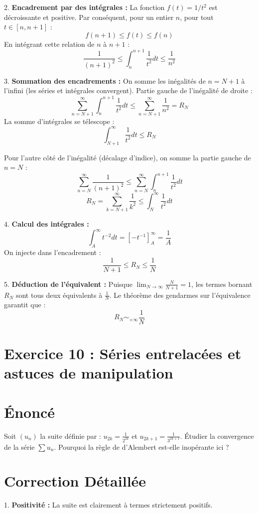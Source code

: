 \documentclass[12pt, a4paper]{article}
\begin{document}
2. \textbf{Encadrement par des intégrales :}
   La fonction $f(t) = 1/t^2$ est décroissante et positive.
   Par conséquent, pour un entier $n$, pour tout $t \in [n, n+1]$ :
   $$f(n+1) \le f(t) \le f(n)$$
   En intégrant cette relation de $n$ à $n+1$ :
   $$\frac{1}{(n+1)^2} \le \int_n^{n+1} \frac{1}{t^2} dt \le \frac{1}{n^2}$$

3. \textbf{Sommation des encadrements :}
   On somme les inégalités de $n=N+1$ à l'infini (les séries et intégrales convergent).
   Partie gauche de l'inégalité de droite :
   $$\sum_{n=N+1}^\infty \int_n^{n+1} \frac{1}{t^2} dt \le \sum_{n=N+1}^\infty \frac{1}{n^2} = R_N$$
   La somme d'intégrales se télescope :
   $$\int_{N+1}^\infty \frac{1}{t^2} dt \le R_N$$

   Pour l'autre côté de l'inégalité (décalage d'indice), on somme la partie gauche de $n=N$ :
   $$\sum_{n=N}^\infty \frac{1}{(n+1)^2} \le \sum_{n=N}^\infty \int_n^{n+1} \frac{1}{t^2} dt$$
   $$R_N = \sum_{k=N+1}^\infty \frac{1}{k^2} \le \int_N^\infty \frac{1}{t^2} dt$$

4. \textbf{Calcul des intégrales :}
   $$\int_A^\infty t^{-2} dt = \left[ -t^{-1} \right]_A^\infty = \frac{1}{A}$$
   On injecte dans l'encadrement :
   $$\frac{1}{N+1} \le R_N \le \frac{1}{N}$$

5. \textbf{Déduction de l'équivalent :}
   Puisque $\lim_{N \to \infty} \frac{N}{N+1} = 1$, les termes bornant $R_N$ sont tous deux équivalents à $\frac{1}{N}$.
   Le théorème des gendarmes sur l'équivalence garantit que :
   $$R_N \sim_{+\infty} \frac{1}{N}$$


\section*{Exercice 10 : Séries entrelacées et astuces de manipulation}

\section{Énoncé}
Soit $(u_n)$ la suite définie par :
$u_{2k} = \frac{1}{2^{2k}}$ et $u_{2k+1} = \frac{1}{3^{2k+1}}$.
Étudier la convergence de la série $\sum u_n$. Pourquoi la règle de d'Alembert est-elle inopérante ici ?

\section{Correction Détaillée}
1. \textbf{Positivité :}
   La suite est clairement à termes strictement positifs.
\end{document}

